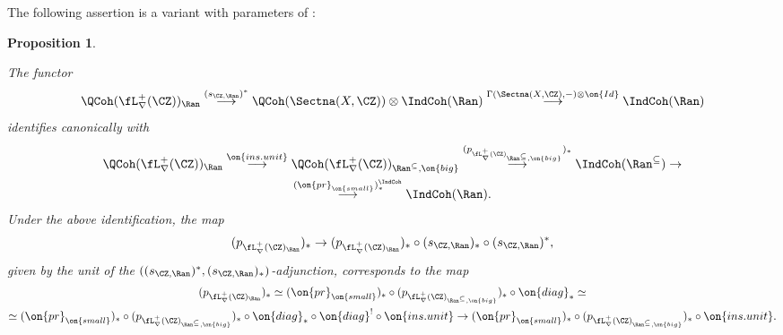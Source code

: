 \documentclass[9pt]{amsart}
\newtheorem{prop}[subsubsection]{Proposition}
\theoremstyle{remark}
\theoremstyle{definition}
\theoremstyle{remark}
\numberwithin{equation}{section}
\begin{document}
\medskip

The following assertion is a variant with parameters of \cite[Proposition 4.6.5]{BD2}:

\begin{prop} \label{p:fact hom} \hfill

\smallskip

The functor 
$$\QCoh(\fL^+_\nabla(\CZ))_\Ran \overset{(s_{\CZ,\Ran})^*}\longrightarrow \QCoh(\Sectna(X,\CZ))\otimes \IndCoh(\Ran) 
\overset{\Gamma(\Sectna(X,\CZ),-)\otimes \on{Id}}\longrightarrow  \IndCoh(\Ran)$$
identifies canonically with
\begin{multline*}
\QCoh(\fL^+_\nabla(\CZ))_\Ran \overset{\on{ins.unit}}\longrightarrow \QCoh(\fL^+_\nabla(\CZ))_{\Ran^{\subseteq},\on{big}}
\overset{(p_{\fL^+_\nabla(\CZ)_{\Ran^{\subseteq},\on{big}}})_*}\longrightarrow \IndCoh(\Ran^{\subseteq})\to  \\
\overset{(\on{pr}_{\on{small}})^{\IndCoh}_*}\longrightarrow \IndCoh(\Ran).
\end{multline*}
Under the above identification, the map 
$$(p_{\fL^+_\nabla(\CZ)_\Ran})_*\to (p_{\fL^+_\nabla(\CZ)_\Ran})_*\circ (s_{\CZ,\Ran})_*\circ (s_{\CZ,\Ran})^*,$$
given by the unit of the $((s_{\CZ,\Ran})^*,(s_{\CZ,\Ran})_*)$-adjunction, corresponds to the map
\begin{multline*}
(p_{\fL^+_\nabla(\CZ)_\Ran})_*\simeq (\on{pr}_{\on{small}})_* \circ (p_{\fL^+_\nabla(\CZ)_{\Ran^{\subseteq},\on{big}}})_* \circ \on{diag}_* \simeq \\
\simeq (\on{pr}_{\on{small}})_* \circ (p_{\fL^+_\nabla(\CZ)_{\Ran^{\subseteq},\on{big}}})_* \circ \on{diag}_*\circ \on{diag}^! \circ \on{ins.unit}
\to (\on{pr}_{\on{small}})_* \circ (p_{\fL^+_\nabla(\CZ)_{\Ran^{\subseteq},\on{big}}})_* \circ \on{ins.unit}.
\end{multline*}

\smallskip


\end{prop}
\end{document}
